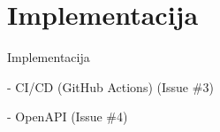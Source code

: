 \chapter{Implementacija}\label{ch:impl}

Implementacija

- CI/CD (GitHub Actions) (Issue \#3)

- OpenAPI (Issue \#4)
